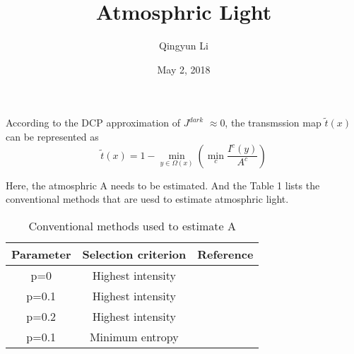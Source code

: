 \documentclass{article}
\author{Qingyun Li}
\date{May 2, 2018}
\title{Atmosphric Light}
\begin{document}
\maketitle
 \par According to the DCP\cite{He2011Single} approximation of $J^{dark}$ $\approx$0, the transmssion map $\tilde{t}(x)$ can be represented as
\begin{equation}
\tilde{t}(x)=1-\min\limits_{y\in\Omega(x)}(\min\limits_{c}\frac{I^{c}(y)}{A^c})
\end{equation}
\par Here, the atmosphric A needs to be estimated. And the Table 1 lists the conventional methods that are uesd to estimate atmosphric light. 
\begin{table}[htbp]
\centering
\caption{Conventional methods used to estimate A}
\begin{tabular}{|c|c|c|}
\hline
Parameter & Selection criterion & Reference \\
\hline 
p=0 & Highest intensity & \cite{Long2013Fast} \\
\hline 
p=0.1 & Highest intensity & \cite{He2011Single} \\
\hline 
p=0.2 & Highest intensity & \cite{Xiao2012Gan} \\
\hline 
p=0.1 & Minimum entropy & \cite{Jeong2013The} \\
\hline
\end{tabular} 
\end{table}


\end{document}

